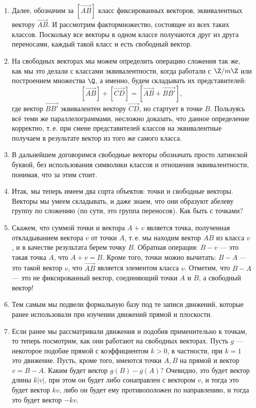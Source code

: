 \begin{enumerate}
\item Далее, обозначим за $[\vec{AB}]$ класс фиксированных векторов, эквивалентных вектору $\vec{AB}$. И рассмотрим фактормножество, состоящее из всех таких классов. Поскольку все векторы в одном классе получаются друг из друга переносами, каждый такой класс и есть свободный вектор.
\item На свободных векторах мы можем определить операцию сложения так же, как мы это делали с классами эквивалентности, когда работали с $\Z/m\Z$ или построением множества $\Q$, а именно, будем складывать их представителей:
\begin{equation}\label{VecSum}
[\vec{AB}] + [\vec{CD}] = [\vec{AB}+\vec{BB'}],
\end{equation}
где вектор $\vec{BB'}$ эквивалентен вектору $\vec{CD}$, но стартует в точке $B$. Пользуясь всё теми же параллелограммами, несложно доказать, что данное определение корректно, т.\,е. при смене представителей классов на эквивалентные получаем в результате вектор из того же самого класса. 
\item В дальнейшем договоримся свободные векторы обозначать просто латинской буквой, без использования символики классов и отношения эквивалентности, понимая, что за этим стоит.
\item Итак, мы теперь имеем два сорта объектов: точки и свободные векторы. Векторы мы умеем складывать, и даже знаем, что они образуют абелеву группу по сложению (по сути, это группа переносов). Как быть с точками?
\item Скажем, что суммой точки и вектора $A+v$ является точка, полученная откладыванием вектора $v$ от точки $A$, т.\,е. мы находим вектор $AB$ из класса $v$, и в качестве результата берем точку $B$. Обратная операция: $B-v$ --- это такая точка $A$, что $A+v=B$. Кроме того, точки можно вычитать: $B-A$ --- это такой вектор $v$, что $\vec{AB}$ является элементом класса $v$. Отметим, что $B-A$ --- это не фиксированный вектор, соединяющий точки $A$ и $B$, а свободный вектор!
\item Тем самым мы подвели формальную базу под те записи движений, которые ранее использовали при изучении движений прямой и плоскости.



\item Если ранее мы рассматривали движения и подобия применительно к точкам, то теперь посмотрим, как они работают на свободных векторах. Пусть $g$ --- некоторое подобие прямой с коэффициентом $k>0$, в частности, при $k=1$ это движение.
Пусть, кроме того, имеются точки $A,B$ на прямой и вектор $v=B-A$. Каким будет вектор $g(B)-g(A)$? Очевидно, это будет вектор длины $k|v|$, при этом он будет либо сонаправлен с вектором $v$, и тогда это будет вектор $kv$, либо он будет ему противоположен по направлению, и тогда это будет вектор $-kv$.


\end{enumerate}
